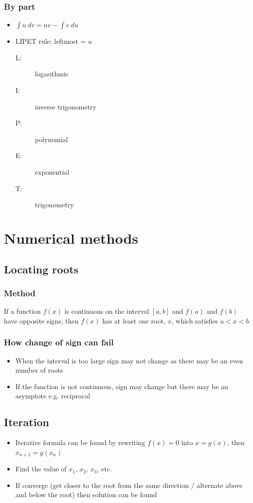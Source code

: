 \documentclass[A4paper]{article}
\begin{document}
	\subsubsection{By part}
	\begin{itemize}
		\item $\int u \: dv = uv - \int v \: du$
		\item LIPET rule: leftmost = $u$
		\begin{description}
			\item[L:] logarithmic
			\item[I:] inverse trigonometry
			\item[P:] polynomial
			\item[E:] exponential
			\item[T:] trigonometry
		\end{description}
	\end{itemize}

	
	\pagebreak

	\section{Numerical methods}
	\subsection{Locating roots}
	\subsubsection{Method}
	If a function $f(x)$ is continuous on the interval $[a,b]$ and $f(a)$ and $f(b)$ have opposite signs, then $f(x)$ has at least one root, $x$, which satisfies $a<x<b$
	\subsubsection{How change of sign can fail}
	\begin{itemize}
		\item When the interval is too large sign may not change as there may be an even number of roots
		\item If the function is not continuous, sign may change but there may be an asymptote e.g. reciprocal
	\end{itemize}
	
	\subsection{Iteration}
	\begin{itemize}
		\item Iterative formula can be found by rewriting $f(x)=0$ into $x=g(x)$, then $x_{n+1}=g(x_n)$
		\item Find the value of $x_1$, $x_2$, $x_3$, etc.
		\item If converge (get closer to the root from the same direction / alternate above and below the root) then solution can be found
	\end{itemize}
	
\end{document}
